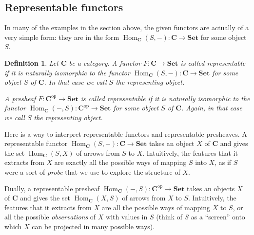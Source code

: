 \documentclass[12pt,oneside,headings=small]{scrbook}
\numberwithin{equation}{section}
\theoremstyle{plain}
\newtheorem{deph}[thm]{Definition}
\theoremstyle{definition}
\DeclareMathOperator{\Hom}{Hom}
\newcommand{\cat}[1]{{\mathbf{#1}}} %
\newcommand{\op}{\mathrm{op}} %
\newcommand{\Set}{\cat{Set}}
\DeclareMathOperator{\1}{\mathbbm{1}}
\DeclareMathOperator{\2}{\mathbbm{2}}
\begin{document}
\subsection{Representable functors}

In many of the examples in the section above, the given functors are actually of a very simple form: they are in the form $\Hom_\cat{C}(S,-):\cat{C}\to\Set$ for some object $S$. 

\begin{deph}
 Let $\cat{C}$ be a category. A functor $F:\cat{C}\to\Set$ is called \emph{representable} if it is naturally isomorphic to the functor $\Hom_\cat{C}(S,-):\cat{C}\to\Set$ for some object $S$ of $\cat{C}$. In that case we call $S$ the \emph{representing object}. 
 
 A presheaf $F:\cat{C}^\op\to\Set$ is called \emph{representable} if it is naturally isomorphic to the functor $\Hom_\cat{C}(-,S):\cat{C}^\op\to\Set$ for some object $S$ of $\cat{C}$. Again, in that case we call $S$ the \emph{representing object}. 
\end{deph}

Here is a way to interpret representable functors and representable presheaves. 
A representable functor $\Hom_\cat{C}(S,-):\cat{C}\to\Set$ takes an object $X$ of $\cat{C}$ and gives the set $\Hom_\cat{C}(S,X)$ of arrows from $S$ to $X$. Intuitively, the features that it extracts from $X$ are exactly all the possible ways of mapping $S$ into $X$, as if $S$ were a sort of \emph{probe} that we use to explore the structure of $X$.

Dually, a representable presheaf $\Hom_\cat{C}(-,S):\cat{C}^\op\to\Set$ takes an objects $X$ of $\cat{C}$ and gives the set $\Hom_\cat{C}(X,S)$ of arrows from $X$ to $S$. Intuitively, the features that it extracts from $X$ are all the possible ways of mapping $X$ to $S$, or all the possible \emph{observations} of $X$ with values in $S$ (think of $S$ as a ``screen'' onto which $X$ can be projected in many possible ways). 
\end{document}
